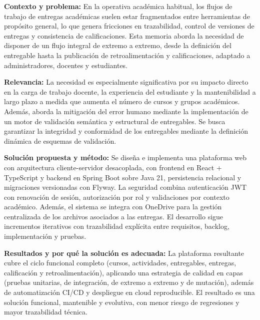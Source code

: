 
\textbf{Contexto y problema:}
En la operativa acad\'emica habitual, los flujos de trabajo de entregas acad\'emicas suelen estar fragmentados entre herramientas de prop\'osito general, lo que genera fricciones en trazabilidad, control de versiones de entregas y consistencia de calificaciones. Esta memoria aborda la necesidad de disponer de un flujo integral de extremo a extremo, desde la definici\'on del entregable hasta la publicaci\'on de retroalimentaci\'on y calificaciones, adaptado a administradores, docentes y estudiantes.

\textbf{Relevancia:}
La necesidad es especialmente significativa por su impacto directo en la carga de trabajo docente, la experiencia del estudiante y la mantenibilidad a largo plazo a medida que aumenta el n\'umero de cursos y grupos acad\'emicos. Adem\'as, aborda la mitigaci\'on del error humano mediante la implementaci\'on de un motor de validaci\'on sem\'antica y estructural de entregables. Se busca garantizar la integridad y conformidad de los entregables mediante la definici\'on din\'amica de esquemas de validaci\'on.

\textbf{Soluci\'on propuesta y m\'etodo:}
Se dise\~na e implementa una plataforma web con arquitectura cliente-servidor desacoplada, con frontend en React + TypeScript y backend en Spring Boot sobre Java 21, persistencia relacional y migraciones versionadas con Flyway. La seguridad combina autenticaci\'on JWT con renovaci\'on de sesi\'on, autorizaci\'on por rol y validaciones por contexto acad\'emico. Adem\'as, el sistema se integra con OneDrive para la gesti\'on centralizada de los archivos asociados a las entregas. El desarrollo sigue incrementos iterativos con trazabilidad expl\'icita entre requisitos, backlog, implementaci\'on y pruebas.

\textbf{Resultados y por qu\'e la soluci\'on es adecuada:}
La plataforma resultante cubre el ciclo funcional completo (cursos, actividades, entregables, entregas, calificaci\'on y retroalimentaci\'on), aplicando una estrategia de calidad en capas (pruebas unitarias, de integraci\'on, de extremo a extremo y de mutaci\'on), adem\'as de automatizaci\'on CI/CD y despliegue en cloud reproducible. El resultado es una soluci\'on funcional, mantenible y evolutiva, con menor riesgo de regresiones y mayor trazabilidad t\'ecnica.
